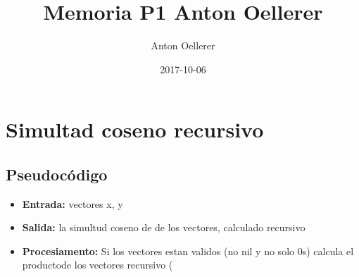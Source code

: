 \documentclass{article}
\title{Memoria P1 Anton Oellerer}
\date{2017-10-06}
\author{Anton Oellerer}
\begin{document}
\maketitle
\section{Simultad coseno recursivo}
\subsection{Pseudoc\'odigo}
\begin{itemize}
\item \textbf{Entrada:} vectores x, y
\item \textbf{Salida:} la simultud coseno de de los vectores, calculado recursivo
\item \textbf{Procesiamento:} Si los vectores estan validos (no nil y no solo 0s) calcula el productode los vectores recursivo (  
\end{itemize}
\end{document}
